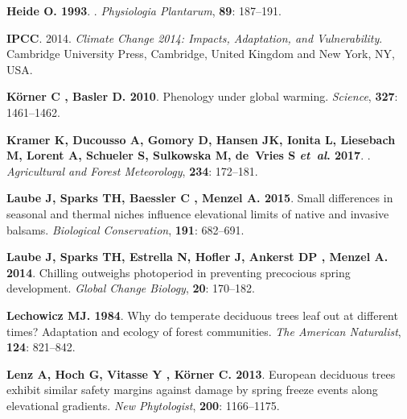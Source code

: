 \documentclass[11pt]{article}
\begin{document}
\begin{thebibliography}{69}
{\bf Heide O}{\bf . 1993{}}.
.
\newblock \emph{Physiologia Plantarum}, {\bf 89}: 187--191.

{\bf IPCC}. 2014.
\newblock \emph{Climate Change 2014: Impacts, Adaptation, and Vulnerability}.
\newblock Cambridge University Press, Cambridge, United Kingdom and New York,
  NY, USA.

{\bf K{\"o}rner C , Basler D}{\bf . 2010}.
\newblock Phenology under global warming.
\newblock \emph{Science}, {\bf 327}: 1461--1462.

{\bf Kramer K, Ducousso A, Gomory D, Hansen JK, Ionita L, Liesebach M, Lorent
  A, Schueler S, Sulkowska M, de~Vries S \emph{et~al}}{\bf . 2017}.
.
\newblock \emph{Agricultural and Forest Meteorology}, {\bf 234}: 172--181.

{\bf Laube J, Sparks TH, Baessler C , Menzel A}{\bf . 2015}.
\newblock Small differences in seasonal and thermal niches influence
  elevational limits of native and invasive balsams.
\newblock \emph{Biological Conservation}, {\bf 191}: 682--691.

{\bf Laube J, Sparks TH, Estrella N, Hofler J, Ankerst DP , Menzel A}{\bf .
  2014}.
\newblock Chilling outweighs photoperiod in preventing precocious spring
  development.
\newblock \emph{Global Change Biology}, {\bf 20}: 170--182.

{\bf Lechowicz MJ}{\bf . 1984}.
\newblock Why do temperate deciduous trees leaf out at different times?
  {Adaptation and ecology of forest communities}.
\newblock \emph{The American Naturalist}, {\bf 124}: 821--842.

{\bf Lenz A, Hoch G, Vitasse Y , K{\"o}rner C}{\bf . 2013}.
\newblock European deciduous trees exhibit similar safety margins against
  damage by spring freeze events along elevational gradients.
\newblock \emph{New Phytologist}, {\bf 200}: 1166--1175.


\end{thebibliography}
\end{document}
